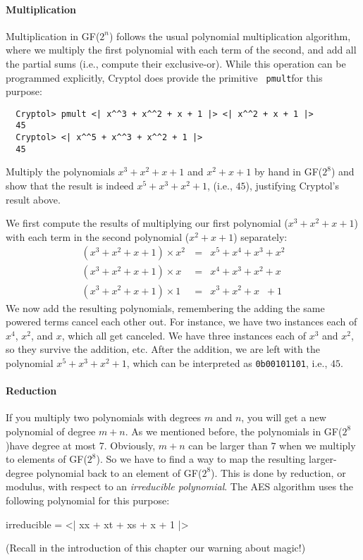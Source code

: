 \paragraph*{Multiplication} Multiplication in GF($2^n$) follows the usual
polynomial multiplication algorithm, where we multiply the first
polynomial with each term of the second, and add all the partial sums
(i.e., compute their exclusive-or). While this operation can be
programmed explicitly, Cryptol does provide the primitive {\tt
  pmult}\indMulPoly for this purpose:
\begin{Verbatim}
  Cryptol> pmult <| x^^3 + x^^2 + x + 1 |> <| x^^2 + x + 1 |>
  45
  Cryptol> <| x^^5 + x^^3 + x^^2 + 1 |>
  45
\end{Verbatim}

\begin{Exercise}\label{ex:gf:1}
  Multiply the polynomials $x^3 +x^2+x+1$ and $x^2+x+1$ by hand in
  GF($2^8$) and show that the result is indeed $x^5+x^3+x^2+1$, (i.e.,
  $45$), justifying Cryptol's result above.
\end{Exercise}
\begin{Answer}
    We first compute the results of multiplying our first
  polynomial ($x^3 +x^2+x+1$) with each term in the second polynomial
  ($x^2+x+1$) separately:
\begin{eqnarray*}
(x^3 + x^2 + x + 1) \times x^2   &=& x^5 + x^4 + x^3 + x^2 \\
(x^3 + x^2 + x + 1) \times x\;\; &=& x^4 + x^3 + x^2 + x \\
(x^3 + x^2 + x + 1) \times 1\;\; &=& x^3 + x^2 + x\;\; + 1
\end{eqnarray*}
We now add the resulting polynomials, remembering the adding the same
powered terms cancel each other out. For instance, we have two
instances each of $x^4$, $x^2$, and $x$, which all get canceled. We
have three instances each of $x^3$ and $x^2$, so they survive the
addition, etc.  After the addition, we are left with the polynomial
$x^5 + x^3 + x^2 + 1$, which can be interpreted as {\tt 0b00101101},
i.e., $45$.
\end{Answer}

\paragraph*{Reduction} If you multiply two polynomials with degrees $m$
and $n$, you will get a new polynomial of degree $m+n$. As we
mentioned before, the polynomials in GF($2^8$)\indGF have degree at
most 7. Obviously, $m+n$ can be larger than $7$ when we multiply to
elements of GF($2^8$).  So we have to find a way to map the resulting
larger-degree polynomial back to an element of GF($2^8$). This is done
by reduction, or modulus, with respect to an {\em irreducible
  polynomial}\indIrredPoly. The AES algorithm uses the following
polynomial for this purpose:
\begin{code}
  irreducible = <| x^^8 + x^^4 + x^^3 + x + 1 |>
\end{code}
(Recall in the introduction of this chapter our warning about magic!)

